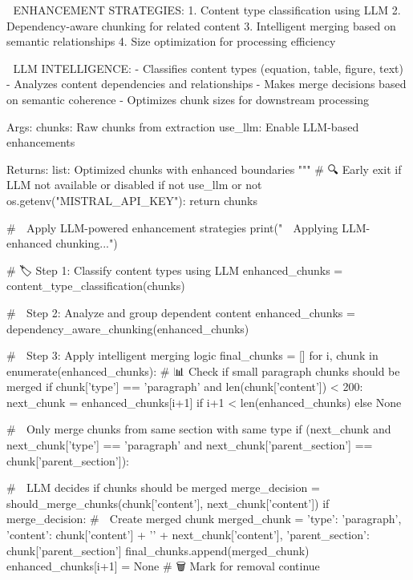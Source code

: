     🎯 ENHANCEMENT STRATEGIES:
    1. Content type classification using LLM
    2. Dependency-aware chunking for related content
    3. Intelligent merging based on semantic relationships
    4. Size optimization for processing efficiency
    
    🧠 LLM INTELLIGENCE:
    - Classifies content types (equation, table, figure, text)
    - Analyzes content dependencies and relationships
    - Makes merge decisions based on semantic coherence
    - Optimizes chunk sizes for downstream processing
    
    Args:
        chunks: Raw chunks from extraction
        use_llm: Enable LLM-based enhancements
        
    Returns:
        list: Optimized chunks with enhanced boundaries
    """
    # 🔍 Early exit if LLM not available or disabled
    if not use_llm or not os.getenv("MISTRAL_API_KEY"):
        return chunks
    
    # 🧠 Apply LLM-powered enhancement strategies
    print("  🧠 Applying LLM-enhanced chunking...")
    
    # 🏷️ Step 1: Classify content types using LLM
    enhanced_chunks = content_type_classification(chunks)
    
    # 🔗 Step 2: Analyze and group dependent content
    enhanced_chunks = dependency_aware_chunking(enhanced_chunks)
    
    # 🔄 Step 3: Apply intelligent merging logic
    final_chunks = []
    for i, chunk in enumerate(enhanced_chunks):
        # 📊 Check if small paragraph chunks should be merged
        if chunk['type'] == 'paragraph' and len(chunk['content']) < 200:
            next_chunk = enhanced_chunks[i+1] if i+1 < len(enhanced_chunks) else None
            
            # 🔗 Only merge chunks from same section with same type
            if (next_chunk and next_chunk['type'] == 'paragraph' and 
                next_chunk['parent_section'] == chunk['parent_section']):
                
                # 🧠 LLM decides if chunks should be merged
                merge_decision = should_merge_chunks(chunk['content'], next_chunk['content'])
                if merge_decision:
                    # 🔗 Create merged chunk
                    merged_chunk = {
                        'type': 'paragraph',
                        'content': chunk['content'] + '\n\n' + next_chunk['content'],
                        'parent_section': chunk['parent_section']
                    }
                    final_chunks.append(merged_chunk)
                    enhanced_chunks[i+1] = None  # 🗑️ Mark for removal
                    continue
        
